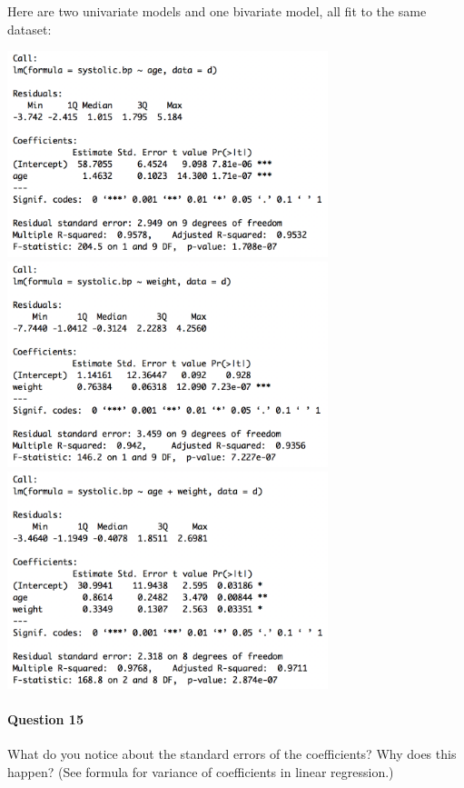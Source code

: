 Here are two univariate models and one bivariate model, all fit to the same dataset:

\begin{center}
\includegraphics[width=0.7\textwidth]{img/collin-model-1.png}\\[5mm]
\includegraphics[width=0.7\textwidth]{img/collin-model-2.png}\\[5mm]
\includegraphics[width=0.7\textwidth]{img/collin-model-3.png}
\end{center}

\paragraph{Question 15} What do you notice about the standard errors of the coefficients? Why does this happen? (See formula for variance of coefficients in linear regression.)

